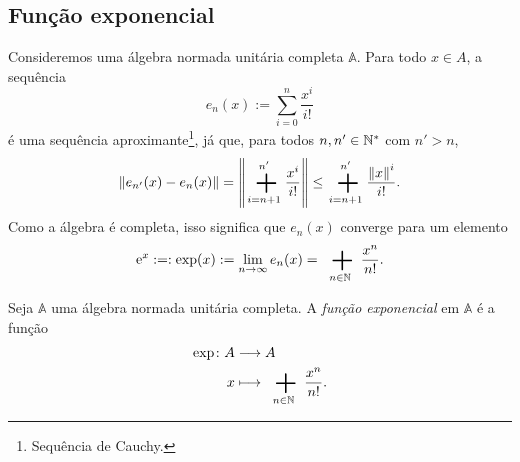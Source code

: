 \subsection{Função exponencial}

Consideremos uma álgebra normada unitária completa $\mathbb A$. Para todo $x \in A$, a sequência
	\begin{equation*}
	e_n(x) := \sum_{i=0}^{n} \frac{x^i}{i!}
	\end{equation*}
é uma sequência aproximante\footnote{Sequência de Cauchy.}, já que, para todos $n,n' \in \mathbb{N}^*$ com $n' > n$,
	\begin{equation*}
	\nor{e_{n'}(x)-e_n(x)} = \nor{\sum_{i=n+1}^{n'} \frac{x^i}{i!}} \leq \sum_{i=n+1}^{n'} \frac{\nor{x}^i}{i!}.
	\end{equation*}
Como a álgebra é completa, isso significa que $e_n(x)$ converge para um elemento
	\begin{equation*}
	\ee^{x} :=: \exp(x) := \lim_{n \to \infty} e_n(x) = \sum_{n \in \N} \frac{x^n}{n!}.
	\end{equation*}

\begin{definition}
Seja $\mathbb A$ uma álgebra normada unitária completa. A \emph{função exponencial} em $\mathbb A$ é a função
	\begin{align*}
	\func{\exp}{A}{A}{x}{\sum_{n \in \N} \frac{x^n}{n!}.}
	\end{align*}
\end{definition}

